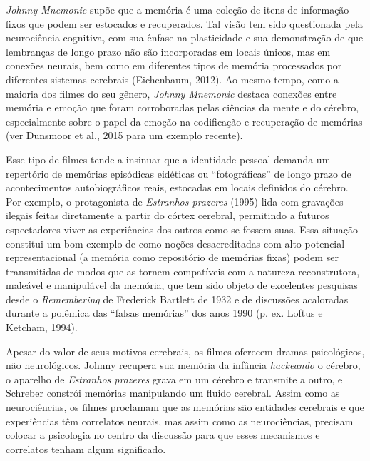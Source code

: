 \emph{Johnny Mnemonic} supõe que a memória é uma coleção de itens de
informação fixos que podem ser estocados e recuperados. Tal visão tem
sido questionada pela neurociência cognitiva, com sua ênfase na
plasticidade e sua demonstração de que lembranças de longo prazo não são
incorporadas em locais únicos, mas em conexões neurais, bem como em
diferentes tipos de memória processados por diferentes sistemas
cerebrais (Eichenbaum, 2012). Ao mesmo tempo, como a maioria dos filmes
do seu gênero, \emph{Johnny Mnemonic} destaca conexões entre memória e
emoção que foram corroboradas pelas ciências da mente e do cérebro,
especialmente sobre o papel da emoção na codificação e recuperação de
memórias (ver Dunsmoor et al., 2015 para um exemplo recente).

Esse tipo de filmes tende a insinuar que a identidade pessoal demanda um
repertório de memórias episódicas eidéticas ou ``fotográficas'' de longo
prazo de acontecimentos autobiográficos reais, estocadas em locais
definidos do cérebro. Por exemplo, o protagonista de \emph{Estranhos
prazeres} (1995) lida com gravações ilegais feitas diretamente a partir
do córtex cerebral, permitindo a futuros espectadores viver as
experiências dos outros como se fossem suas. Essa situação constitui um
bom exemplo de como noções desacreditadas com alto potencial
representacional (a memória como repositório de memórias fixas) podem
ser transmitidas de modos que as tornem compatíveis com a natureza
reconstrutora, maleável e manipulável da memória, que tem sido objeto de
excelentes pesquisas desde o \emph{Remembering} de Frederick Bartlett de
1932 e de discussões acaloradas durante a polêmica das ``falsas
memórias'' dos anos 1990 (p. ex. Loftus e Ketcham, 1994).

Apesar do valor de seus motivos cerebrais, os filmes oferecem dramas
psicológicos, não neurológicos. Johnny recupera sua memória da infância
\emph{hackeando} o cérebro, o aparelho de \emph{Estranhos prazeres}
grava em um cérebro e transmite a outro, e Schreber constrói memórias
manipulando um fluido cerebral. Assim como as neurociências, os filmes
proclamam que as memórias são entidades cerebrais e que experiências têm
correlatos neurais, mas assim como as neurociências, precisam colocar a
psicologia no centro da discussão para que esses mecanismos e correlatos
tenham algum significado.

